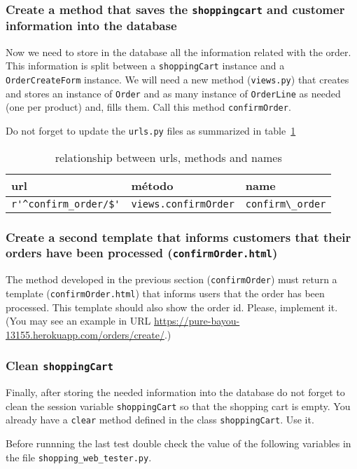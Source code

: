 \documentclass[12pt]{article} %
\newcommand{\ttt}[1]{\texttt{#1}}%
\newcommand{\hhh}[1]{\texttt{#1}}%
\newcommand{\views}{\texttt{views.py}}%
\newcommand{\urls}{\texttt{urls.py}}%
\begin{document}
\subsubsection{Create a method that saves the \ttt{shoppingcart} and customer information into the database}
Now we need to store in the database all the information related with the order. This information is split between a \ttt{shoppingCart} instance and a  \ttt{OrderCreateForm} instance. We will need a new method (\views{}) that creates and stores an instance of  \ttt{Order} and as many instance of \ttt{OrderLine} as needed (one per product) and, fills them. Call this method \ttt{confirmOrder}.

Do not forget to update the \urls{} files as summarized in  table~\ref{tab:urlsconfirmorder}

\begin{table}[H]
\centering
\begin{tabular}{lll}
    \textbf{url} & \textbf{método} & \textbf{name} \\ \hline
 \verb|r'^confirm_order/$'|  & \verb|views.confirmOrder|  & \verb|confirm\_order|\\
\end{tabular}
\caption{relationship between urls, methods and names}
\label{tab:urlsconfirmorder}
\end{table}

\subsubsection{Create a second template that informs customers that their orders have been processed (\hhh{confirmOrder.html})}
The method developed in the previous section (\ttt{confirmOrder}) must return a  
template (\hhh{confirmOrder.html}) that informs users that the order has been processed.
This template should also show the order id. Please, implement it. (You may see an example in URL \url{https://pure-bayou-13155.herokuapp.com/orders/create/}.)

\subsubsection{Clean  \ttt{shoppingCart}}
Finally,  after storing the needed information into the database do not forget to clean the session variable \ttt{shoppingCart} so that the shopping cart is empty. You already have a  \ttt{clear} method defined in the class \ttt{shoppingCart}. Use it.

Before runnning the last test double check the value of the following variables in the file \ttt{shopping\_web\_tester.py}.
\end{document}
